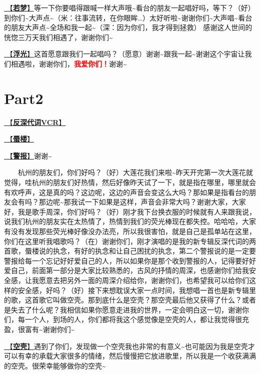 \documentclass[]{ctexbook}
\begin{document}
\hyperref[ruomeng]{🎵【\textbf{若梦}】}等一下你要唱得跟喊一样大声哦\textasciitilde 看台的朋友一起唱好吗，等下？（好）到你们\textasciitilde 大声点\textasciitilde（米：往事流转，在你眼眸\ldots）太好听啦\textasciitilde 谢谢你们\textasciitilde 大声唱\textasciitilde 看台的朋友大声点\textasciitilde 全场和我一起\textasciitilde（深：因为你们，我才得到拯救）
感谢这人世间的恍惚三万天我们相遇了，谢谢你们\textasciitilde{}

\hyperref[floating-light]{🎵【\textbf{浮光}】}这首愿意跟我们一起唱吗？（愿意）谢谢\textasciitilde 跟我一起\textasciitilde 谢谢这个宇宙让我们相遇啦，谢谢你们，\textbf{\textcolor{red}{我爱你们！}}谢谢\textasciitilde{}

\section{Part2}\label{hangzhou-20240824-part2}

\hyperref[senself-vcr]{🎥【\textbf{反深代词VCR}】}

\hyperref[mirage]{🎵【\textbf{蜃楼}】}

\hyperref[the-giver]{🎵【\textbf{警报}】}谢谢\textasciitilde{}

  杭州的朋友们，你们好吗？（好）大莲花我们来啦\textasciitilde 昨天开完第一次大莲花就觉得，哇杭州的朋友们好热情，然后好像昨天试了一下，就是指在哪里，哪里就会有欢呼声，这是真的吗？这边呢，这边的声音会变这么大吗？那如果是指看台的朋友会有吗？那边呢\textasciitilde 那我试一下如果是这样，声音会非常大吗？谢谢大家，大家好，我是歌手周深，你们好吗？（好）刚才我下台换衣服的时候就有人来跟我说，说我们杭州的朋友实在太热情了，热情到我们的荧光棒现在都失控。哈哈哈，大家有没有发现那些荧光棒好像没办法亮，所以我很害怕，就是自己是孤单站在这里，你们在这里听我唱歌吗？（在）谢谢你们，刚才演唱的是我的新专辑反深代词的两首歌，蜃楼说的执念，有好的执念和让自己困扰的执念，第二个警报说的是一定要警报给每一个忘记好好爱自己的人，所以如果你是那个收到警报的人，记得要好好爱自己，前面第一部分是大家比较熟悉的，古风的抒情的周深，也感谢你们给我安全感，让我愿意去把另外一面的周深介绍给你，谢谢你们，也希望我可以给你们这样的安全感，好吗？（好）接下来想耽误大家一点时间，我想唱一首也是新专辑里的歌，这首歌它叫做空壳。那到底什么是空壳？那空壳最后他又获得了什么？或者是失去了什么呢？我相信如果你愿意走进我的世界，一定会明白这一切，谢谢你们，每一个人，到场的人，你们都将我这个感觉像是空壳的人，都让我觉得很充盈，很富有\textasciitilde 谢谢你们\textasciitilde{}

\hyperref[shen]{🎵【\textbf{空壳}】}遇到了你们，发现做一个空壳我也非常的有意义\textasciitilde 也可能因为我是空壳才可以有幸的承载大家很多的情绪，然后慢慢把它放进歌里，所以我是一个收获满满的空壳。很荣幸能够做你的空壳\textasciitilde{}
\end{document}
